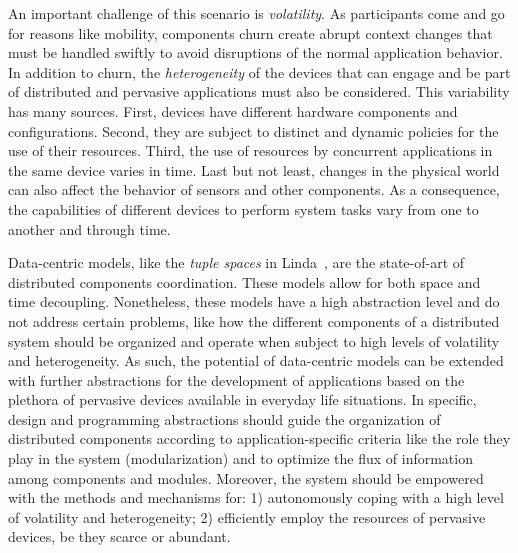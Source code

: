 An important challenge of this scenario is \textit{volatility}. As participants come and go for reasons like mobility, components churn create abrupt context changes that must be handled swiftly to avoid disruptions of the normal application behavior. 
In addition to churn, the \textit{heterogeneity} of the devices that can engage and be part of distributed and pervasive applications must also be considered. This variability has many sources. First, devices have different hardware components and configurations. Second, they are subject to distinct and dynamic policies for the use of their resources. Third, the use of resources by concurrent applications in the same device varies in time. Last but not least, changes in the physical world %
can also affect the behavior of sensors and other components. As a consequence, the capabilities of different devices to perform system tasks vary from one to another and through time.



Data-centric models, like the \textit{tuple spaces} in Linda~\cite{LINDA}, are the state-of-art of distributed components coordination. These models allow for both space and time decoupling. %
Nonetheless, these models have a high abstraction level and do not address certain problems, like how the different components of a distributed system should be organized and operate when subject to high levels of volatility and heterogeneity. As such, the potential of data-centric models can be extended with further abstractions for the development of applications based on the plethora of pervasive devices available in everyday life situations. In specific, design and programming abstractions should guide the organization of distributed components according to application-specific criteria like the role they play in the system (modularization) and to optimize the flux of information among components and modules. Moreover, the system should be empowered with the methods and mechanisms for: 1) autonomously coping with a high level of volatility and heterogeneity; 2) efficiently employ the resources of pervasive devices, be they scarce or abundant.


